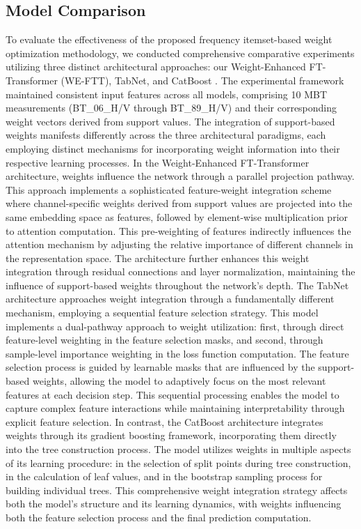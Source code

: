 \documentclass[fleqn,10pt]{wlscirep_mdpi_style}
\begin{document}
\subsection{Model Comparison}
To evaluate the effectiveness of the proposed frequency itemset-based weight optimization methodology, we conducted comprehensive comparative experiments utilizing three distinct architectural approaches: our Weight-Enhanced FT-Transformer (WE-FTT), TabNet\cite{arikTabNetAttentiveInterpretable2021}, and CatBoost \cite{prokhorenkovaCatBoostUnbiasedBoosting2018}. The experimental framework maintained consistent input features across all models, comprising 10 MBT measurements (BT\_06\_H/V through BT\_89\_H/V) and their corresponding weight vectors derived from support values.
The integration of support-based weights manifests differently across the three architectural paradigms, each employing distinct mechanisms for incorporating weight information into their respective learning processes. In the Weight-Enhanced FT-Transformer architecture, weights influence the network through a parallel projection pathway. This approach implements a sophisticated feature-weight integration scheme where channel-specific weights derived from support values are projected into the same embedding space as features, followed by element-wise multiplication prior to attention computation. This pre-weighting of features indirectly influences the attention mechanism by adjusting the relative importance of different channels in the representation space. The architecture further enhances this weight integration through residual connections and layer normalization, maintaining the influence of support-based weights throughout the network's depth.
The TabNet architecture approaches weight integration through a fundamentally different mechanism, employing a sequential feature selection strategy. This model implements a dual-pathway approach to weight utilization: first, through direct feature-level weighting in the feature selection masks, and second, through sample-level importance weighting in the loss function computation. The feature selection process is guided by learnable masks that are influenced by the support-based weights, allowing the model to adaptively focus on the most relevant features at each decision step. This sequential processing enables the model to capture complex feature interactions while maintaining interpretability through explicit feature selection.
In contrast, the CatBoost architecture integrates weights through its gradient boosting framework, incorporating them directly into the tree construction process. The model utilizes weights in multiple aspects of its learning procedure: in the selection of split points during tree construction, in the calculation of leaf values, and in the bootstrap sampling process for building individual trees. This comprehensive weight integration strategy affects both the model's structure and its learning dynamics, with weights influencing both the feature selection process and the final prediction computation.
\end{document}
